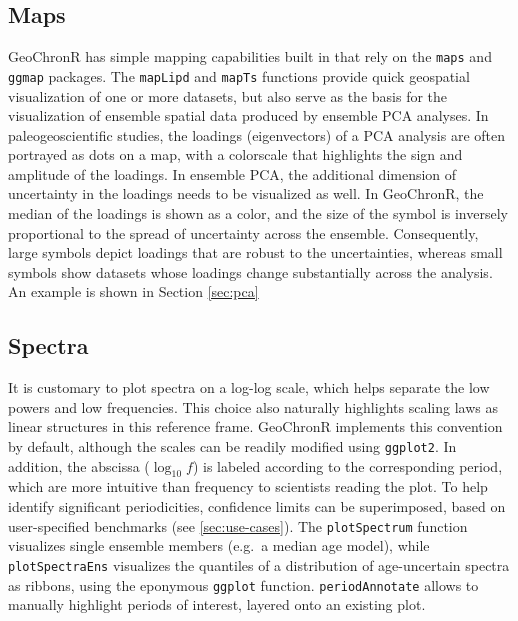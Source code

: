 \documentclass[gchron, manuscript]{copernicus}
\begin{document}
\subsection{Maps}

GeoChronR has simple mapping capabilities built in that rely on the \texttt{maps} \citep{maps} and \texttt{ggmap} \citep{ggmap} packages.
The \texttt{mapLipd} and \texttt{mapTs} functions provide quick geospatial visualization of one or more datasets, but also serve as the basis for the visualization of ensemble spatial data produced by ensemble PCA analyses.
In paleogeoscientific studies, the loadings (eigenvectors) of a PCA analysis are often portrayed as dots on a map, with a colorscale that highlights the sign and amplitude of the loadings.
In ensemble PCA, the additional dimension of uncertainty in the loadings needs to be visualized as well.
In GeoChronR, the median of the loadings is shown as a color, and the size of the symbol is inversely proportional to the spread of uncertainty across the ensemble.
Consequently, large symbols depict loadings that are robust to the uncertainties, whereas small symbols show datasets whose loadings change substantially across the analysis.
An example is shown in Section \ref{sec:pca}

\hypertarget{sec:spec_viz}{%
\subsection{Spectra}\label{sec:spec_viz}}

It is customary to plot spectra on a log-log scale, which helps separate the low powers and low frequencies.
This choice also naturally highlights scaling laws \citep{lovejoy2013weather, ZhuPNAS2019} as linear structures in this reference frame.
GeoChronR implements this convention by default, although the scales can be readily modified using \texttt{ggplot2}.
In addition, the abscissa (\(\log_{10} f\)) is labeled according to the corresponding period, which are more intuitive than frequency to scientists reading the plot.
To help identify significant periodicities, confidence limits can be superimposed, based on user-specified benchmarks (see \ref{sec:use-cases}).
The \texttt{plotSpectrum} function visualizes single ensemble members (e.g.~a median age model), while \texttt{plotSpectraEns} visualizes the quantiles of a distribution of age-uncertain spectra as ribbons, using the eponymous \texttt{ggplot} function.
\texttt{periodAnnotate} allows to manually highlight periods of interest, layered onto an existing plot.
\end{document}
